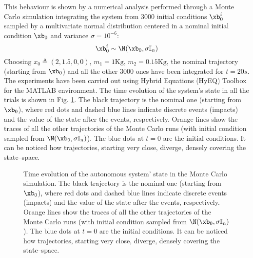 This behaviour is shown by a numerical analysis performed through a Monte Carlo simulation integrating the system from 3000 initial conditions $\xb_0^i$ sampled by a multivariate normal distribution centered in a nominal initial condition $\xb_0$ and variance $\sigma = 10^{-6}$:
%
\begin{equation}
    \xb_0^i \sim \N(\xb_0,\sigma\mathbb{I}_n)
\end{equation}
%
Choosing $x_0\triangleq(2,1.5,0,0)$, $m_1 = 1\text{Kg}$, $m_2 = 0.15\text{Kg}$, the nominal trajectory (starting from $\xb_0$) and all the other 3000 ones have been integrated for $t = 20s$. The experiments have been carried out using Hybrid Equations (HyEQ) Toolbox \cite{sanfelice2013toolbox} for the MATLAB environment. The time evolution of the system's state in all the trials is shown in Fig. \ref{fig:chaos1}. The black trajectory is the nominal one (starting from $\xb_0$), where red dots and dashed blue lines indicate discrete events (impacts) and the value of the state after the events, respectively. Orange lines show the traces of all the other trajectories of the Monte Carlo runs (with initial condition sampled from $\N(\xb_0,\sigma\mathbb{I}_n)$). The blue dots at $t=0$ are the initial conditions. It can be noticed how trajectories, starting very close, diverge, densely covering the state--space.
%
\begin{figure}[!ht]
    \centering
    \caption[Time evolution of the autonomous system' state in the Monte Carlo simulation]{Time evolution of the autonomous system' state in the Monte Carlo simulation. The black trajectory is the nominal one (starting from $\xb_0$), where red dots and dashed blue lines indicate discrete events (impacts) and the value of the state after the events, respectively. Orange lines show the traces of all the other trajectories of the Monte Carlo runs (with initial condition sampled from $\N(\xb_0,\sigma\mathbb{I}_n)$). The blue dots at $t=0$ are the initial conditions. It can be noticed how trajectories, starting very close, diverge, densely covering the state--space.}
    \label{fig:chaos1}
\end{figure}
%

